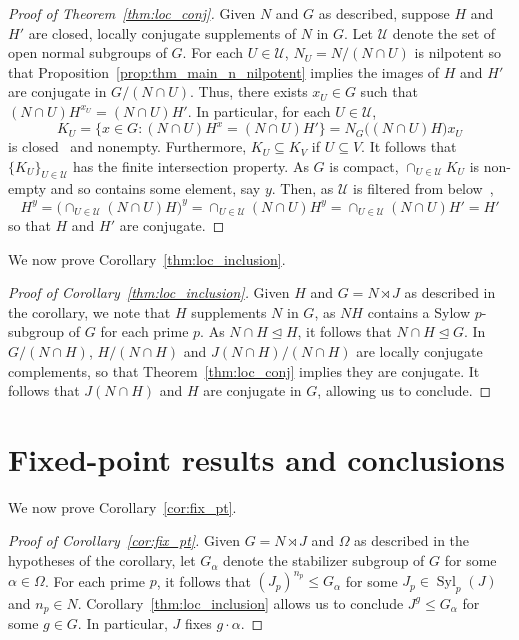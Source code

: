 \documentclass{amsart}
\theoremstyle{definition}
\theoremstyle{remark}
\numberwithin{equation}{section}
\newcommand{\semi}{\rtimes}
\newcommand{\normal}{\trianglelefteq}
\DeclareMathOperator{\Syl}{Syl}
\begin{document}
\begin{proof}[Proof of Theorem~\ref{thm:loc_conj}]

	Given $N$ and $G$ as described, suppose $H$ and $H'$ are closed, locally conjugate supplements of $N$ in $G$. Let $\mathcal U$ denote the set of open normal subgroups of $G$. For each $U\in\mathcal U$, $N_U=N/(N\cap U)$ is nilpotent so that Proposition~\ref{prop:thm_main_n_nilpotent} implies the images of $H$ and $H'$ are conjugate in $G/(N\cap U)$. Thus, there exists $x_U \in G$ such that $(N\cap U)H^{x_U}=(N\cap U)H'$. In particular, for each $U\in \mathcal U$,
	\begin{equation*}
		K_U = \{x \in G: (N\cap U)H^x=(N\cap U)H' \} = N_G\big((N\cap U)H\big) x_U
	\end{equation*}
	is closed~\cite[Exer.~0.4(2)(a)]{Wil98} and nonempty. Furthermore, $K_U \subseteq K_V$ if $U\subseteq V$. It follows that $\{K_U\}_{U \in \mathcal U}$ has the finite intersection property. As $G$ is compact, $\cap_{U\in\mathcal U} K_U$ is non-empty and so contains some element, say $y$. Then, as $\mathcal U$ is filtered from below~\cite[Prop.~2.1.4]{Rib10},
	\[
		H^y = \big(\cap_{U\in\mathcal U} (N\cap U)H\big)^y
		= \cap_{U\in\mathcal U} (N\cap U)H^y
		=  \cap_{U\in\mathcal U} (N\cap U)H'
		= H'
	\]
	so that $H$ and $H'$ are conjugate.
\end{proof}

We now prove Corollary~\ref{thm:loc_inclusion}.

\begin{proof}[Proof of Corollary~\ref{thm:loc_inclusion}]
	Given $H$ and $G=N\semi J$ as described in the corollary, we note that $H$ supplements $N$ in $G$, as $NH$ contains a Sylow $p$-subgroup of $G$ for each prime $p$.
	As $N\cap H \normal H$, it follows that $N\cap H \normal G$. In $G/(N\cap H)$, $H/(N\cap H)$ and $J(N\cap H)/(N\cap H)$ are locally conjugate complements, so that Theorem~\ref{thm:loc_conj} implies they are conjugate. It follows that $J(N\cap H)$ and $H$ are conjugate in $G$, allowing us to conclude.
\end{proof}


\section{Fixed-point results and conclusions}
\label{s:fixed}

We now prove Corollary~\ref{cor:fix_pt}.

\begin{proof}[Proof of Corollary~\ref{cor:fix_pt}]
	Given $G=N \semi J$ and $\Omega$ as described in the hypotheses of the corollary, let $G_\alpha$ denote the stabilizer subgroup of $G$ for some $\alpha\in\Omega$. For each prime $p$, it follows that $(J_p)^{n_p} \leq G_\alpha$ for some $J_p \in\Syl_p(J)$ and $n_p\in N$. Corollary~\ref{thm:loc_inclusion} allows us to conclude $J^g \leq G_\alpha$ for some $g\in G$. In particular, $J$ fixes $g\cdot\alpha$.
\end{proof}
\end{document}
